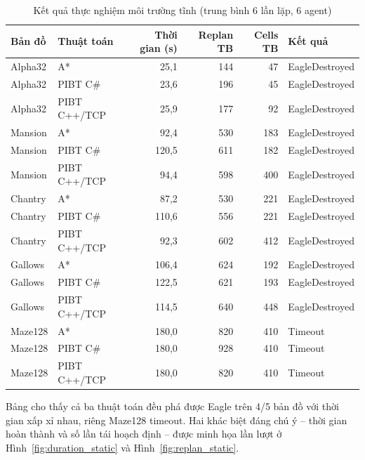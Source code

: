 \documentclass[../DoAn.tex]{subfiles}
\begin{document}
\begin{table}[htbp]
\centering
\caption{Kết quả thực nghiệm môi trường tĩnh (trung bình 6 lần lặp, 6 agent)}
\label{tab:static_results}
\small
\setlength{\tabcolsep}{5pt}
\begin{tabular}{|l|l|r|r|r|l|}
\hline
\textbf{Bản đồ} & \textbf{Thuật toán} & \textbf{Thời gian (s)} & \textbf{Replan TB} & \textbf{Cells TB} & \textbf{Kết quả} \\ \hline
Alpha32  & A*            & 25,1  &   144  &    47  & EagleDestroyed \\
Alpha32  & PIBT C\#      & 23,6  &   196  &    45  & EagleDestroyed \\
Alpha32  & PIBT C++/TCP  & 25,9  &   177  &    92  & EagleDestroyed \\ \hline
Mansion  & A*            & 92,4  &   530  &   183  & EagleDestroyed \\
Mansion  & PIBT C\#      & 120,5 &   611  &   182  & EagleDestroyed \\
Mansion  & PIBT C++/TCP  & 94,4  &   598  &   400  & EagleDestroyed \\ \hline
Chantry  & A*            & 87,2  &   530  &   221  & EagleDestroyed \\
Chantry  & PIBT C\#      & 110,6 &   556  &   221  & EagleDestroyed \\
Chantry  & PIBT C++/TCP  & 92,3  &   602  &   412  & EagleDestroyed \\ \hline
Gallows  & A*            & 106,4 &   624  &   192  & EagleDestroyed \\
Gallows  & PIBT C\#      & 122,5 &   621  &   193  & EagleDestroyed \\
Gallows  & PIBT C++/TCP  & 114,5 &   640  &   448  & EagleDestroyed \\ \hline
Maze128  & A*            & 180,0 &   820  &   410  & Timeout        \\
Maze128  & PIBT C\#      & 180,0 &   928  &   410  & Timeout        \\
Maze128  & PIBT C++/TCP  & 180,0 &   820  &   410  & Timeout        \\ \hline
\end{tabular}
\end{table}

Bảng cho thấy cả ba thuật toán đều phá được Eagle trên 4/5 bản đồ với thời gian xấp xỉ nhau,
riêng Maze128 timeout. Hai khác biệt đáng chú ý -- thời gian hoàn thành và số lần tái hoạch
định -- được minh họa lần lượt ở Hình~\ref{fig:duration_static} và Hình~\ref{fig:replan_static}.
\end{document}
